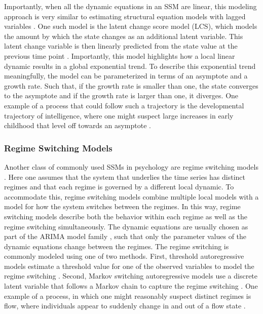 Importantly, when all the dynamic equations in an SSM are linear, this modeling
approach is
very similar to estimating structural equation models with lagged variables
\parencite{asparouhov_dynamic_2018, usami_unified_2019}. One such model is the
latent change score
model (LCS), which models the amount by which the state changes as an
additional latent variable.
This latent change variable is then linearly predicted from the state value at
the previous time
point \parencite{cancer_dynamical_2021, cancer_effectiveness_2023}.
Importantly, this model
highlights how a local linear dynamic results in a global exponential
trend. To describe this exponential trend meaningfully, the model can be
parameterized in terms of an asymptote and a
growth rate. Such that, if the growth rate is smaller than one, the state
converges
to the asymptote and if the growth rate is larger than one, it diverges. One
example of a process
that could follow such a trajectory is the developmental trajectory of
intelligence,
where one might suspect large increases in early childhood
that level off towards an asymptote \parencite{savi_evolving_2021}.

\subsubsection{Regime Switching Models}

Another class of commonly used SSMs in psychology are regime switching models
\parencite{hamaker_regime-switching_2010}.
Here one assumes that the system that underlies the time series has distinct
regimes and that each
regime is governed by a different local dynamic. To accommodate this, regime
switching models
combine multiple local models with a model for how the system switches between
the regimes.
In this way, regime switching models describe both the behavior within each
regime as well as the regime switching simultaneously.
The dynamic equations are usually chosen as part of the ARIMA model family
\parencite{box_time_1970}, such that only
the parameter values of the dynamic equations change between the regimes. The
regime switching is commonly modeled using
one of two methods. First, threshold autoregressive models estimate a threshold
value for one of the
observed variables to model the regime switching
\parencite{tong_threshold_1980}.
Second, Markov switching autoregressive models use a discrete latent variable
that follows a Markov chain
to capture the regime switching \parencite{hamilton_new_1989}. One example of a
process,
in which one might reasonably suspect distinct regimes is flow, where
individuals appear to
suddenly change in and out of a flow state \parencite{ceja_suddenly_2012}.
